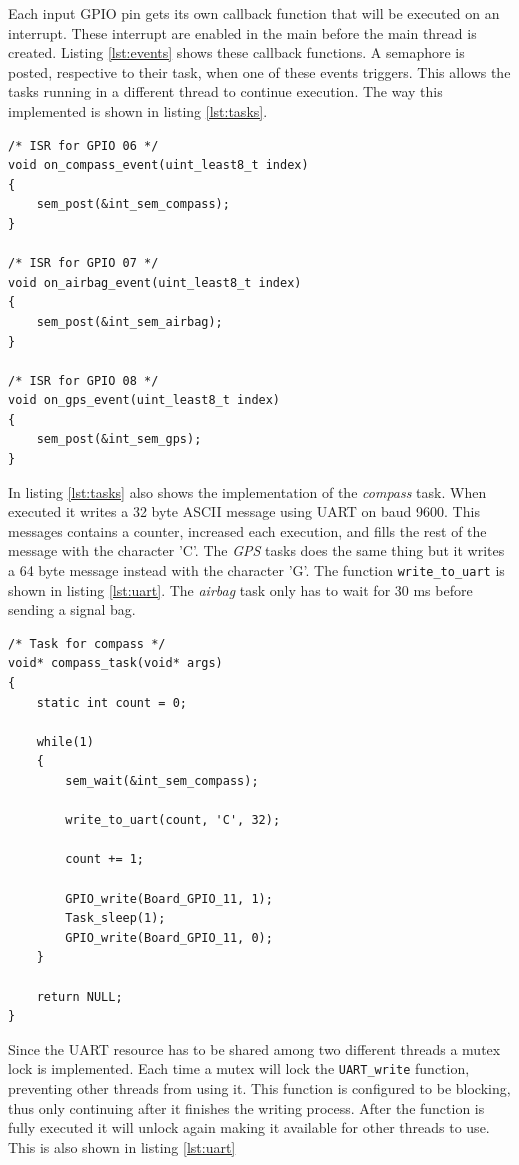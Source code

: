 \documentclass[10pt]{article}
\begin{document}
Each input GPIO pin gets its own callback function that will be executed on an interrupt. These interrupt are
enabled in the main before the main thread is created. Listing \ref{lst:events} shows these callback functions.
A semaphore is posted, respective to their task, when one of these events triggers. This allows the tasks
running in a different thread to continue execution. The way this implemented is shown in listing \ref{lst:tasks}.

\begin{lstlisting}[style=CStyle, caption={Interrupt callbacks}, captionpos=b, label={lst:events}, escapechar=@]
/* ISR for GPIO 06 */
void on_compass_event(uint_least8_t index)
{
    sem_post(&int_sem_compass);
}

/* ISR for GPIO 07 */
void on_airbag_event(uint_least8_t index)
{
    sem_post(&int_sem_airbag);
}

/* ISR for GPIO 08 */
void on_gps_event(uint_least8_t index)
{
    sem_post(&int_sem_gps);
}
\end{lstlisting}

In listing \ref{lst:tasks} also shows the implementation of the \textit{compass} task. When executed it writes a 32 byte ASCII
message using UART on baud 9600. This messages contains a counter, increased each execution, and fills the rest of the message with the character 'C'.
The \textit{GPS} tasks does the same thing but it writes a 64 byte message instead with the character 'G'. The function \texttt{write\_to\_uart} is shown in listing \ref{lst:uart}.
The \textit{airbag} task only has to wait for 30 ms before sending a signal bag.

\begin{lstlisting}[style=CStyle, caption={Tasks implementation}, captionpos=b, label={lst:tasks}, escapechar=@]
/* Task for compass */
void* compass_task(void* args)
{
    static int count = 0;

    while(1)
    {
        sem_wait(&int_sem_compass);

        write_to_uart(count, 'C', 32);

        count += 1;

        GPIO_write(Board_GPIO_11, 1);
        Task_sleep(1);
        GPIO_write(Board_GPIO_11, 0);
    }

    return NULL;
}
\end{lstlisting}

Since the UART resource has to be shared among two different threads a mutex lock is implemented. Each time a mutex will lock
the \texttt{UART\_write} function, preventing other threads from using it. This function is configured to be blocking, thus
only continuing after it finishes the writing process. After the function is fully executed
it will unlock again making it available for other threads to use. This is also shown in listing \ref{lst:uart}
\end{document}
